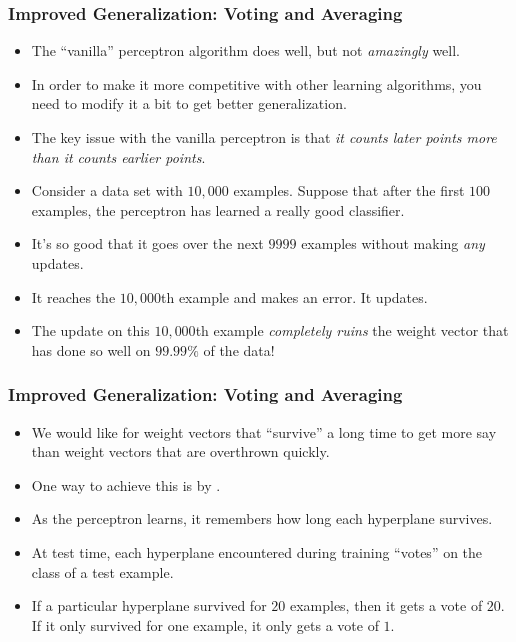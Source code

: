 \documentclass[trans]{beamer}
\begin{document}
\fi
\begin{frame}
  \frametitle{Improved Generalization: Voting and Averaging}
\begin{itemize}
\item The
``vanilla'' perceptron algorithm does well, but not \emph{amazingly}
well.  
\item In order to make it more competitive with other learning
algorithms, you need to modify it a bit to get better generalization.
\item The key issue with the vanilla perceptron is that \emph{it counts
  later points more than it counts earlier points}.
\item Consider a data set with $10,000$ examples.  Suppose that
after the first $100$ examples, the perceptron has learned a really
good classifier. 
\item It's so good that it goes over the next $9999$
examples without making \emph{any} updates.  
\item It reaches the $10,000$th
example and makes an error.  It updates.  
\item The update
on this $10,000$th example \emph{completely ruins} the weight vector
that has done so well on $99.99\%$ of the data!
\end{itemize}
\end{frame}
\begin{frame}
  \frametitle{Improved Generalization: Voting and Averaging}
\begin{itemize}
\item 
We would like for weight vectors that ``survive'' a long time
to get more say than weight vectors that are overthrown quickly. 
\item One
way to achieve this is by . 
\item As the perceptron learns,
it remembers how long each hyperplane survives.
\item  At test time, each
hyperplane encountered during training ``votes'' on the class of a
test example. 
\item  If a particular hyperplane survived for $20$ examples,
then it gets a vote of $20$.  If it only survived for one example, it
only gets a vote of $1$.  
\end{itemize}
\end{frame}
\end{document}
